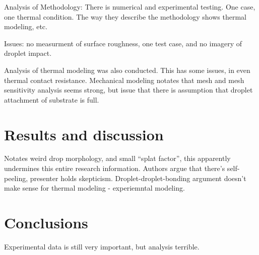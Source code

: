 \documentclass[10pt, oneside]{article}
\begin{document}
Analysis of Methodology:
There is numerical and experimental testing. One case, one thermal condition. The way they describe the methodology shows thermal modeling, etc. 

Issues: no measurment of surface roughness, one test case, and no imagery of droplet impact. 

Analysis of thermal modeling was also conducted. This has some issues, in even thermal contact resistance. Mechanical modeling notates that mesh and mesh sensitivity analysis seems strong, but issue that there is assumption that droplet attachment of substrate is full. 

\section{Results and discussion}
Notates weird drop morphology, and small ``splat factor'', this apparently undermines this entire research information. Authors argue that there's self-peeling, presenter holds skepticism. Droplet-droplet-bonding argument doesn't make sense for thermal modeling - experiemntal modeling. 

\section{Conclusions}
Experimental data is still very important, but analysis terrible. 
\end{document}
